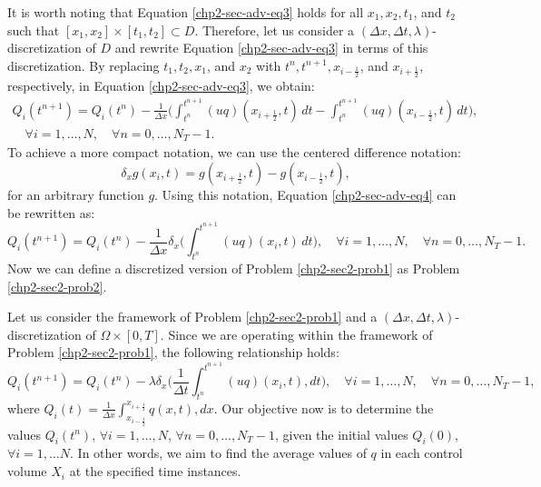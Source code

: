 It is worth noting that Equation \eqref{chp2-sec-adv-eq3} holds for all $x_1, x_2, t_1$, and $t_2$ such that $[x_1, x_2]
\times [t_1, t_2] \subset D$. Therefore, let us consider a $(\Delta x, \Delta t, \lambda)$-discretization of $D$ and 
rewrite Equation \eqref{chp2-sec-adv-eq3} in terms of this discretization. By replacing $t_1, t_2, x_1$, and $x_2$ with
$t^{n}, t^{n+1}, x_{i-\frac{1}{2}}$, and $x_{i+\frac{1}{2}}$, respectively, in Equation \eqref{chp2-sec-adv-eq3}, we obtain:
\begin{equation}
    \label{chp2-sec-adv-eq4}
	\begin{aligned}
		{Q}_i(t^{n+1}) =  {Q}_i(t^{n}) -
		\frac{1}{\Delta x}\bigg( \int_{t^{n}}^{t^{n+1}}
        	{(uq)}(x_{i+\frac{1}{2}}, t) \,dt -
		\int_{t^{n}}^{t^{n+1}}{(uq)}(x_{i-\frac{1}{2}}, t) \,dt \bigg), \\
		\quad \forall i = 1, \ldots, N,
		\quad \forall n = 0, \ldots, N_T-1.
	\end{aligned}
\end{equation}
To achieve a more compact notation, we can use the centered difference notation:
\begin{equation}
    \label{chp2-sec-adv-eq5}
	\delta_x {g}(x_i,t) = 
	{g}(x_{i+\frac{1}{2}},t) - 
	{g}(x_{i-\frac{1}{2}},t),
\end{equation}
for an arbitrary function ${g}$. Using this notation, Equation
\eqref{chp2-sec-adv-eq4} can be rewritten as:
\begin{equation}
    \label{chp2-sec-adv-eq6}
    {Q}_i(t^{n+1}) =  {Q}_i(t^{n}) -
	\frac{1}{\Delta x} \delta _x\bigg( \int_{t^{n}}^{t^{n+1}}
        {(uq)}(x_{i}, t) \,dt \bigg),
        \quad \forall i = 1, \ldots, N,
        \quad \forall n = 0, \ldots, N_T-1.
\end{equation}
Now we can define a discretized version of Problem \ref{chp2-sec2-prob1} as Problem \ref{chp2-sec2-prob2}.
\begin{prob}
	\label{chp2-sec2-prob2}
	Let us consider the framework of Problem \ref{chp2-sec2-prob1} and a $(\Delta x, \Delta t, \lambda)$-discretization of 
	$\Omega \times [0,T]$. Since we are operating within the framework of Problem \ref{chp2-sec2-prob1}, the following relationship holds:
	\begin{equation}
		\label{1d-fvexact-scheme}
		{Q}_i(t^{n+1}) = {Q}_i(t^{n}) - \lambda \delta_x\bigg( \frac{1}{\Delta t}\int_{t^{n}}^{t^{n+1}}{(uq)}(x_{i}, t) ,dt \bigg),
		 \quad \forall i = 1, \ldots, N, \quad \forall n = 0, \ldots, N_T-1,
	\end{equation}
	where ${Q}_i(t) = \frac{1}{\Delta x}\int_{x_{i-\frac{1}{2}}}^{x_{i+\frac{1}{2}}} {q}(x,t) ,dx$. 
	Our objective now is to determine the values ${Q}_i(t^{n})$, $\forall i = 1, \ldots, N$, $\forall n = 0, \ldots, N_T-1$,
	given the initial values ${Q}_i(0)$, $\forall i = 1, \ldots N$. 
	In other words, we aim to find the average values of ${q}$ in each control volume $X_i$ at the specified time instances.
\end{prob}
